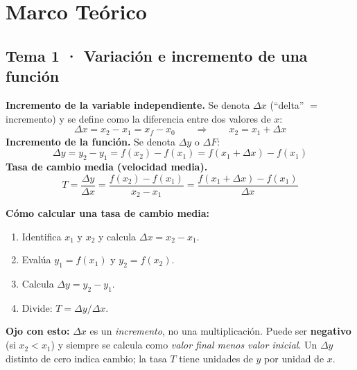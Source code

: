 \documentclass[12pt, letterpaper]{article}
\begin{document}


\vspace{8pt}

\section{Marco Teórico}

\subsection{Tema 1 · Variación e incremento de una función}

\begin{cuadroteoria}
  \textbf{Incremento de la variable independiente.} Se denota $\Delta x$ (``delta'' $=$ incremento) y se define como la diferencia entre dos valores de $x$:
  \[
    \Delta x = x_2 - x_1 = x_f - x_0
    \qquad\Longrightarrow\qquad
    x_2 = x_1 + \Delta x
  \]
  \textbf{Incremento de la función.} Se denota $\Delta y$ o $\Delta F$:
  \[
    \Delta y = y_2 - y_1 = f(x_2) - f(x_1) = f(x_1 + \Delta x) - f(x_1)
  \]
  \textbf{Tasa de cambio media (velocidad media).}
  \[
    T = \frac{\Delta y}{\Delta x} = \frac{f(x_2) - f(x_1)}{x_2 - x_1} = \frac{f(x_1 + \Delta x) - f(x_1)}{\Delta x}
  \]
\end{cuadroteoria}

\begin{cuadropasos}
  \textbf{Cómo calcular una tasa de cambio media:}
  \begin{enumerate}
    \item Identifica $x_1$ y $x_2$ y calcula $\Delta x = x_2 - x_1$.
    \item Evalúa $y_1 = f(x_1)$ y $y_2 = f(x_2)$.
    \item Calcula $\Delta y = y_2 - y_1$.
    \item Divide: $T = \Delta y / \Delta x$.
  \end{enumerate}
\end{cuadropasos}

\begin{cuadroadvertencia}
  \textbf{Ojo con esto:} $\Delta x$ es un \emph{incremento}, no una multiplicación. Puede ser \textbf{negativo} (si $x_2 < x_1$) y siempre se calcula como \emph{valor final menos valor inicial}. Un $\Delta y$ distinto de cero indica cambio; la tasa $T$ tiene unidades de $y$ por unidad de $x$.
\end{cuadroadvertencia}
\end{document}
